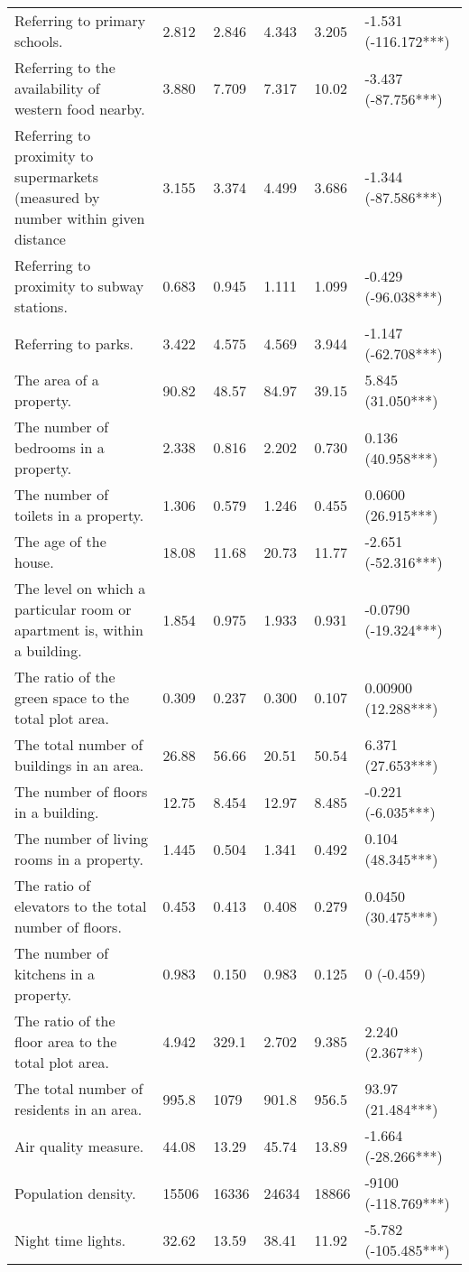 \begin{tabular}{llllll}
Referring to primary schools. & 2.812 & 2.846 & 4.343 & 3.205 & -1.531 (-116.172***) \\
Referring to the availability of western food nearby. & 3.880 & 7.709 & 7.317 & 10.02 & -3.437 (-87.756***) \\
Referring to proximity to supermarkets (measured by number within given distance & 3.155 & 3.374 & 4.499 & 3.686 & -1.344 (-87.586***) \\
Referring to proximity to subway stations. & 0.683 & 0.945 & 1.111 & 1.099 & -0.429 (-96.038***) \\
Referring to parks. & 3.422 & 4.575 & 4.569 & 3.944 & -1.147 (-62.708***) \\
The area of a property. & 90.82 & 48.57 & 84.97 & 39.15 & 5.845 (31.050***) \\
The number of bedrooms in a property. & 2.338 & 0.816 & 2.202 & 0.730 & 0.136 (40.958***) \\
The number of toilets in a property. & 1.306 & 0.579 & 1.246 & 0.455 & 0.0600 (26.915***) \\
The age of the house. & 18.08 & 11.68 & 20.73 & 11.77 & -2.651 (-52.316***) \\
The level on which a particular room or apartment is, within a building. & 1.854 & 0.975 & 1.933 & 0.931 & -0.0790 (-19.324***) \\
The ratio of the green space to the total plot area. & 0.309 & 0.237 & 0.300 & 0.107 & 0.00900 (12.288***) \\
The total number of buildings in an area. & 26.88 & 56.66 & 20.51 & 50.54 & 6.371 (27.653***) \\
The number of floors in a building. & 12.75 & 8.454 & 12.97 & 8.485 & -0.221 (-6.035***) \\
The number of living rooms in a property. & 1.445 & 0.504 & 1.341 & 0.492 & 0.104 (48.345***) \\
The ratio of elevators to the total number of floors. & 0.453 & 0.413 & 0.408 & 0.279 & 0.0450 (30.475***) \\
The number of kitchens in a property. & 0.983 & 0.150 & 0.983 & 0.125 & 0 (-0.459) \\
The ratio of the floor area to the total plot area. & 4.942 & 329.1 & 2.702 & 9.385 & 2.240 (2.367**) \\
The total number of residents in an area. & 995.8 & 1079 & 901.8 & 956.5 & 93.97 (21.484***) \\
Air quality measure. & 44.08 & 13.29 & 45.74 & 13.89 & -1.664 (-28.266***) \\
Population density. & 15506 & 16336 & 24634 & 18866 & -9100 (-118.769***) \\
Night time lights. & 32.62 & 13.59 & 38.41 & 11.92 & -5.782 (-105.485***) \\
\bottomrule
\end{tabular}
